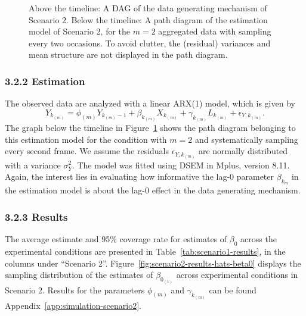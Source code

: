 \documentclass[man]{apa7} %
\begin{document}
\begin{figure}
    \vspace{0.5cm}
    \caption{Above the timeline: A DAG of the data generating mechanism of Scenario 2. Below the timeline: A path diagram of the estimation model of Scenario 2, for the $m = 2$ aggregated data with sampling every two occasions. To avoid clutter, the (residual) variances and mean structure are not displayed in the path diagram.}
    \label{fig:scenario2}
\end{figure}

\subsubsection{3.2.2 Estimation}
The observed data are analyzed with a linear ARX(1) model, which is given by
\begin{equation} \label{eq:scenario2-estimation}
    Y_{k_{(m)}} = \phi_{(m)} Y_{k_{(m)} - 1} + \beta_{k_{(m)}} X_{k_{(m)}} + \gamma_{k_{(m)}} L_{k_{(m)}} + \epsilon_{Y,k_{(m)}}.
\end{equation}
The graph below the timeline in Figure~\ref{fig:scenario2} shows the path diagram belonging to this estimation model for the condition with $m = 2$ and systematically sampling every second frame. We assume the residuals $\epsilon_{Y,k_{(m)}}$ are normally distributed with a variance $\sigma^{2}_{Y}$. The model was fitted using DSEM in Mplus, version 8.11. Again, the interest lies in evaluating how informative the lag-0 parameter $\beta_{k_{m}}$ in the estimation model is about the lag-0 effect in the data generating mechanism. 

\subsubsection{3.2.3 Results}
The average estimate and 95\% coverage rate for estimates of $\beta_{0}$ across the experimental conditions are presented in Table~\ref{tab:scenario1-results}, in the columns under ``Scenario 2''. Figure~\ref{fig:scenario2-results-hats-beta0} displays the sampling distribution of the estimates of $\beta_{0_{(1)}}$ across experimental conditions in Scenario 2. Results for the parameters $\phi_{(m)}$ and $\gamma_{k_{(m)}}$ can be found Appendix~\ref{app:simulation-scenario2}.
\end{document}
